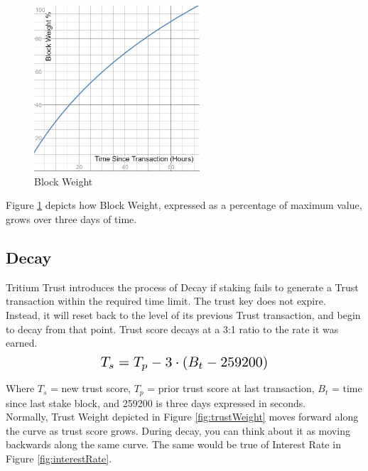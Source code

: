 \documentclass[11pt]{article}
\begin{document}
\begin{figure}[h!]
    \centering
    \includegraphics[width=0.55\textwidth]{images/blockWeight.png}
    \caption{Block Weight \label{fig:blockWeight}}
\end{figure}

\noindent Figure \ref{fig:blockWeight} depicts how Block Weight, expressed as a percentage of maximum value, grows over three days of time.\\

\subsection{Decay}
Tritium Trust introduces the process of Decay if staking fails to generate a Trust transaction within the required time limit. The trust key does not expire. Instead, it will reset back to the level of its previous Trust transaction, and begin to decay from that point. Trust score decays at a 3:1 ratio to the rate it was earned.\\
\begin{equation}
\resizebox{.50\hsize}{!}{$T_s = T_p - 3 \cdot (B_t - 259200)$}
\end{equation}

\noindent Where $T_s$ = new trust score, $T_p$ = prior trust score at last transaction, $B_t$ = time since last stake block, and 259200 is three days expressed in seconds.\\

\noindent Normally, Trust Weight depicted in Figure \ref{fig:trustWeight} moves forward along the curve as trust score grows. During decay, you can think about it as moving backwards along the same curve. The same would be true of Interest Rate in Figure \ref{fig:interestRate}. \\
\end{document}
